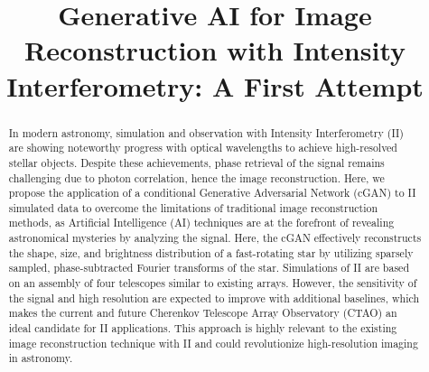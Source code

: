 \documentclass[fleqn,usenatbib,twocolumn]{mnras}
\title{Generative AI for Image Reconstruction with Intensity Interferometry: A First Attempt}
\date{}
\begin{document}
\maketitle

\begin{abstract}
In modern astronomy, simulation and observation with Intensity Interferometry (II) are showing noteworthy progress with optical wavelengths to achieve high-resolved stellar objects. Despite these achievements, phase retrieval of the signal remains challenging due to photon correlation, hence the image reconstruction. Here, we propose the application of a conditional Generative Adversarial Network (cGAN) to II simulated data to overcome the limitations of traditional image reconstruction methods, as Artificial Intelligence (AI) techniques are at the forefront of revealing astronomical mysteries by analyzing the signal. Here, the cGAN effectively reconstructs the shape, size, and brightness distribution of a fast-rotating star by utilizing sparsely sampled, phase-subtracted Fourier transforms of the star. Simulations of II are based on an assembly of four telescopes similar to existing arrays. However, the sensitivity of the signal and high resolution are expected to improve with additional baselines, which makes the current and future Cherenkov Telescope Array Observatory (CTAO) an ideal candidate for II applications. This approach is highly relevant to the existing image reconstruction technique with II and could revolutionize high-resolution imaging in astronomy.
\end{abstract}









\end{document}
